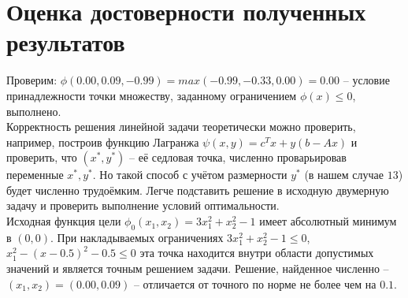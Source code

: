 \documentclass[main.tex]{subfiles}
\begin{document}
\section{Оценка достоверности полученных результатов}
Проверим: $\phi(0.00, 0.09, -0.99) = max(-0.99, -0.33, 0.00) = 0.00$ -- условие принадлежности точки множеству, заданному ограничением $\phi(x) \le 0$, выполнено.\\
Корректность решения линейной задачи теоретически можно проверить, например, построив функцию Лагранжа $\psi(x,y)=c^T x+y(b-Ax)$ и проверить, что $(x^*,y^*)$ -- её седловая точка, численно проварьировав переменные $x^*, y^*$. Но такой способ с учётом размерности $y^*$ (в нашем случае $13$) будет численно трудоёмким. Легче подставить решение в исходную двумерную задачу и проверить выполнение условий оптимальности.\\
Исходная функция цели $\phi_0(x_1, x_2)=3x_1^2+x_2^2-1$ имеет абсолютный минимум в $(0,0)$. При накладываемых ограничениях  $3x_1^2+x_2^2-1 \le 0$, $x_1^2 - (x-0.5)^2 -0.5 \le 0$ эта точка находится внутри области допустимых значений и является точным решением задачи. Решение, найденное численно -- $(x_1, x_2)=(0.00, 0.09)$ -- отличается от точного по норме не более чем на $0.1$.
\end{document}

